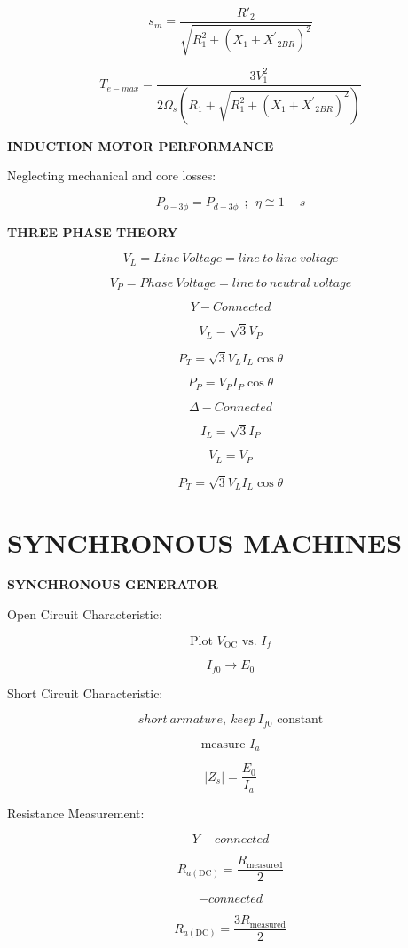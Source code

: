 \begin{multicols}{2}
	\[s_{m} = \frac{{R'}_{2}}{\sqrt{R_{1}^{2} + {(X_{1} + {X^{'}}_{2BR})}^{2}}}\]
	
	\[T_{e - max} = \frac{3V_{1}^{2}}{2\Omega_{s}\left( R_{1} + \sqrt{R_{1}^{2} + \left( X_{1} + {X^{'}}_{2BR} \right)^{2}} \right)}\]
	
	\textbf{INDUCTION MOTOR PERFORMANCE}
	
	Neglecting mechanical and core losses:
	
	\[P_{o - 3\phi} = P_{d - 3\phi}\ \ ;\ \ \eta \cong 1 - s\]
	
	\textbf{THREE PHASE THEORY}
	
	\[V_{L} = Line\ Voltage = line\ to\ line\ voltage\]
	
	\[V_{P} = Phase\ Voltage = line\ to\ neutral\ voltage\]
	
	\[Y - Connected\]
	
	\[V_{L} = \sqrt{3}V_{P}\]
	
	\[P_{T} = \sqrt{3}V_{L}I_{L}\cos\theta\]
	
	\[P_{P} = V_{P}I_{P}\cos\theta\]
	
	\[\Delta - Connected\]
	
	\[I_{L} = \sqrt{3}I_{P}\]
	
	\[V_{L} = V_{P}\]
	
	\[P_{T} = \sqrt{3}V_{L}I_{L}\cos\theta\]
	
	\section{SYNCHRONOUS MACHINES}
	
	\textbf{SYNCHRONOUS GENERATOR}
	
	Open Circuit Characteristic:
	
	\[\text{Plot\ }V_{\text{OC}}\text{\ vs.\ }I_{f}\]
	
	\[I_{f0} \rightarrow E_{0}\]
	
	Short Circuit Characteristic:
	
	\[short\ armature,\ keep\ I_{f0}\text{\ constant}\]
	
	\[\text{measure\ }I_{a}\]
	
	\[\left| Z_{s} \right| = \frac{E_{0}}{I_{a}}\]
	
	Resistance Measurement:
	
	\[Y - connected\]
	
	\[R_{a\left( \text{DC} \right)} = \frac{R_{\text{measured}}}{2}\]
	
	\[- connected\]
	
	\[R_{a\left( \text{DC} \right)} = \frac{3R_{\text{measured}}}{2}\]
	

\end{multicols}
